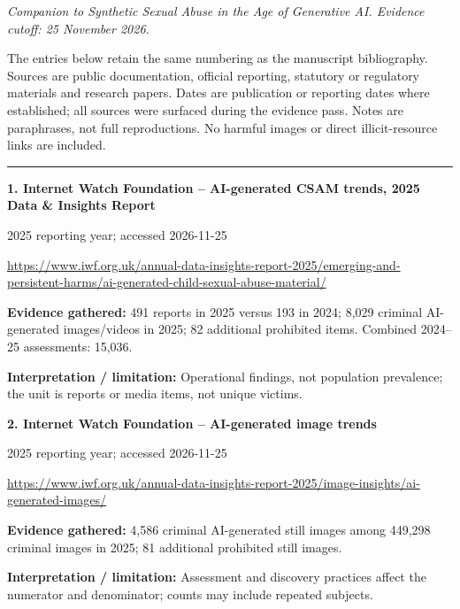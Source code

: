 \documentclass[11pt,a4paper]{article}
\begin{document}
\par\vspace{3mm}
\textit{Companion to Synthetic Sexual Abuse in the Age of Generative AI. Evidence cutoff: 25 November 2026.}\par
The entries below retain the same numbering as the manuscript bibliography. Sources are public documentation, official reporting, statutory or regulatory materials and research papers. Dates are publication or reporting dates where established; all sources were surfaced during the evidence pass. Notes are paraphrases, not full reproductions. No harmful images or direct illicit-resource links are included.\par\hrule\vspace{3mm}
\noindent\begin{minipage}{\linewidth}\textbf{1. Internet Watch Foundation -- AI-generated CSAM trends, 2025 Data \& Insights Report}\par{\small 2025 reporting year; accessed 2026-11-25\par\url{https://www.iwf.org.uk/annual-data-insights-report-2025/emerging-and-persistent-harms/ai-generated-child-sexual-abuse-material/}}\par
\textbf{Evidence gathered:} 491 reports in 2025 versus 193 in 2024; 8,029 criminal AI-generated images/videos in 2025; 82 additional prohibited items. Combined 2024--25 assessments: 15,036.\par\textbf{Interpretation / limitation:} Operational findings, not population prevalence; the unit is reports or media items, not unique victims.\par
\end{minipage}\par\vspace{2mm}
\noindent\begin{minipage}{\linewidth}\textbf{2. Internet Watch Foundation -- AI-generated image trends}\par{\small 2025 reporting year; accessed 2026-11-25\par\url{https://www.iwf.org.uk/annual-data-insights-report-2025/image-insights/ai-generated-images/}}\par
\textbf{Evidence gathered:} 4,586 criminal AI-generated still images among 449,298 criminal images in 2025; 81 additional prohibited still images.\par\textbf{Interpretation / limitation:} Assessment and discovery practices affect the numerator and denominator; counts may include repeated subjects.\par
\end{minipage}\par\vspace{2mm}
\end{document}
